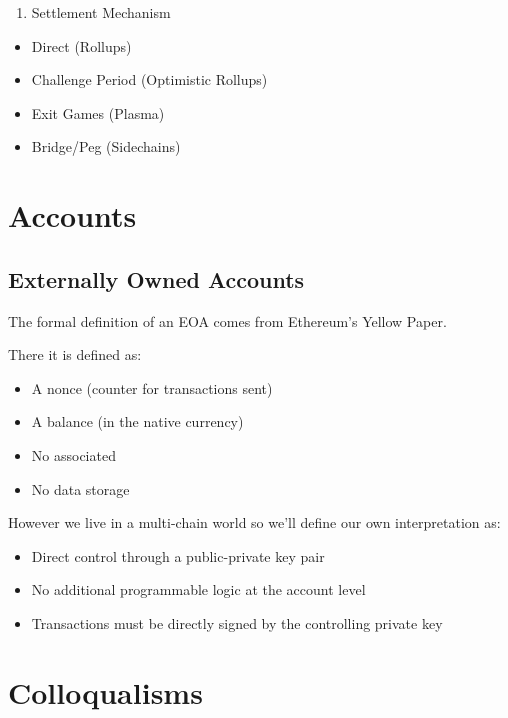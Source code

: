 \documentclass[
  letterpaper,
  DIV=11,
  numbers=noendperiod]{scrreprt}
\providecommand{\tightlist}{%
  \setlength{\itemsep}{0pt}\setlength{\parskip}{0pt}}\usepackage{longtable,booktabs,array}
\begin{document}
\begin{enumerate}
\def\labelenumi{\arabic{enumi}.}
\setcounter{enumi}{3}
\tightlist
\item
  Settlement Mechanism
\end{enumerate}

\begin{itemize}
\tightlist
\item
  Direct (Rollups)
\item
  Challenge Period (Optimistic Rollups)
\item
  Exit Games (Plasma)
\item
  Bridge/Peg (Sidechains)
\end{itemize}

\section{Accounts}\label{accounts}

\subsection{Externally Owned Accounts}\label{eoa}

The formal definition of an EOA comes from Ethereum's Yellow Paper.

There it is defined as:

\begin{itemize}
\tightlist
\item
  A nonce (counter for transactions sent)
\item
  A balance (in the native currency)
\item
  No associated
\item
  No data storage
\end{itemize}

However we live in a multi-chain world so we'll define our own
interpretation as:

\begin{itemize}
\tightlist
\item
  Direct control through a public-private key pair
\item
  No additional programmable logic at the account level
\item
  Transactions must be directly signed by the controlling private key
\end{itemize}

\section{Colloqualisms}\label{colloqualisms}
\end{document}
